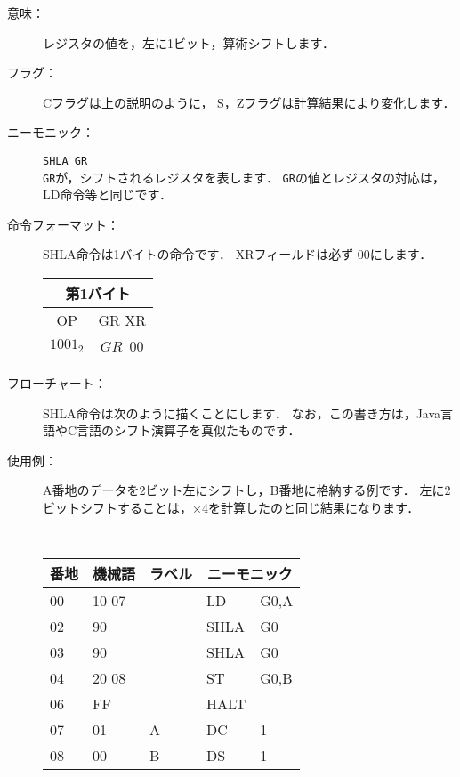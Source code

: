 \begin{center}
\epsfxsize=5cm
\end{center}

\begin{description}
\item[意味：]レジスタの値を，左に1ビット，算術シフトします．

\item[フラグ：]Cフラグは上の説明のように，
S，Zフラグは計算結果により変化します．

\item[ニーモニック：]{\tt SHLA  GR} \\
{\tt GR}が，シフトされるレジスタを表します．
{\tt GR}の値とレジスタの対応は，LD命令等と同じです．

\item[命令フォーマット：]SHLA命令は1バイトの命令です．
XRフィールドは必ず $00$にします．

\begin{tabular}{|c|c|} \hline
\multicolumn{2}{|c|}{第1バイト} \\
\hline
OP & GR XR \\
\hline
$1001_2$ & $GR$~$00$ \\
\hline
\end{tabular}

\item[フローチャート：]SHLA命令は次のように描くことにします．
なお，この書き方は，Java言語やC言語のシフト演算子を真似たものです．

\begin{flushleft}
\epsfxsize=3cm
\end{flushleft}

\item[使用例：]
A番地のデータを2ビット左にシフトし，B番地に格納する例です．
左に2ビットシフトすることは，×4を計算したのと同じ結果になります．

{\tt
\begin{tabular}{|l|l|l|l l|} \hline
番地 & 機械語 & ラベル & \multicolumn{2}{|c|}{ニーモニック} \\
\hline
00 & 10 07 &   & LD   & G0,A \\
02 & 90    &   & SHLA & G0   \\
03 & 90    &   & SHLA & G0   \\
04 & 20 08 &   & ST   & G0,B \\
06 & FF    &   & HALT &      \\
07 & 01    & A & DC   & 1    \\
08 & 00    & B & DS   & 1    \\
\hline
\end{tabular}
}
\end{description}


